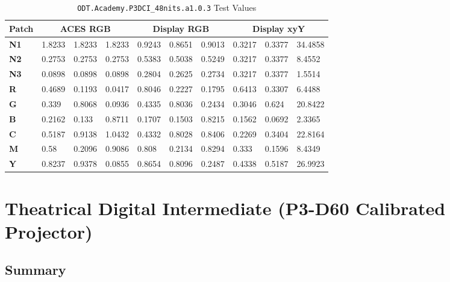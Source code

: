 \begin{table}[ht!]
    \centering
    \begin{tabular}{|l|l|l|l|l|l|l|l|l|l|}
        \hline
        \multicolumn{1}{|c|}{\textbf{Patch}} & \multicolumn{3}{c|}{\textbf{ACES RGB}} & \multicolumn{3}{c|}{\textbf{Display RGB}} & \multicolumn{3}{c|}{\textbf{Display xyY}} \\ \hline
        \textbf{N1} & 1.8233 & 1.8233 & 1.8233 & 0.9243 & 0.8651 & 0.9013 & 0.3217 & 0.3377 & 34.4858 \\ \hline
        \textbf{N2} & 0.2753 & 0.2753 & 0.2753 & 0.5383 & 0.5038 & 0.5249 & 0.3217 & 0.3377 & 8.4552  \\ \hline
        \textbf{N3} & 0.0898 & 0.0898 & 0.0898 & 0.2804 & 0.2625 & 0.2734 & 0.3217 & 0.3377 & 1.5514  \\ \hline
        \textbf{R}  & 0.4689 & 0.1193 & 0.0417 & 0.8046 & 0.2227 & 0.1795 & 0.6413 & 0.3307 & 6.4488  \\ \hline
        \textbf{G}  & 0.339  & 0.8068 & 0.0936 & 0.4335 & 0.8036 & 0.2434 & 0.3046 & 0.624  & 20.8422 \\ \hline
        \textbf{B}  & 0.2162 & 0.133  & 0.8711 & 0.1707 & 0.1503 & 0.8215 & 0.1562 & 0.0692 & 2.3365  \\ \hline
        \textbf{C}  & 0.5187 & 0.9138 & 1.0432 & 0.4332 & 0.8028 & 0.8406 & 0.2269 & 0.3404 & 22.8164 \\ \hline
        \textbf{M}  & 0.58   & 0.2096 & 0.9086 & 0.808  & 0.2134 & 0.8294 & 0.333  & 0.1596 & 8.4349  \\ \hline
        \textbf{Y}  & 0.8237 & 0.9378 & 0.0855 & 0.8654 & 0.8096 & 0.2487 & 0.4338 & 0.5187 & 26.9923 \\ \hline
    \end{tabular}
    \caption{ \texttt{ODT.Academy.P3DCI\_48nits.a1.0.3} Test Values}
    \label{tab:testValues-p3dci}
\end{table}


\clearpage
\section{Theatrical Digital Intermediate (P3-D60 Calibrated Projector)}
\label{sec:ot-app-p3d60}

\subsection{Summary}
\label{subsec:summary-p3d60}

